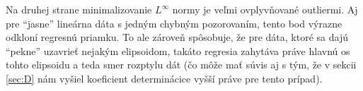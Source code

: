 \documentclass[report.tex]{subfiles}
\begin{document}
Na druhej strane minimalizovanie $L^{\infty}$ normy je veľmi ovplyvňované outliermi. Aj pre \enquote{jasne} lineárna dáta s jedným chybným pozorovaním, tento bod výrazne odkloní regresnú priamku. To ale zároveň spôsobuje, že pre dáta, ktoré sa dajú \enquote{pekne} uzavrieť nejakým elipsoidom, takáto regresia zahytáva práve hlavnú os tohto elipsoidu a teda smer rozptylu dát (čo môže mať súvis aj s tým, že v sekcii \ref{sec:D} nám vyšiel koeficient determinácice vyšší práve pre tento prípad).

\end{document}
